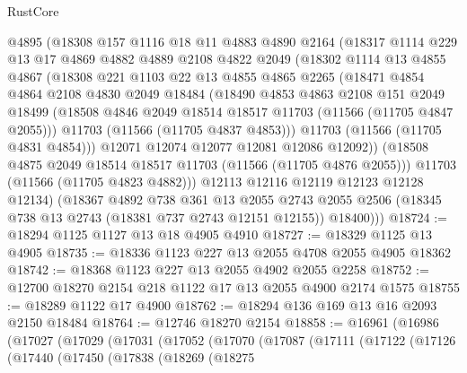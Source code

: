 \begin{lexlean}{RustCore}
\begin{coremodule}
        @4895
        (@18308
          @157
          @1116
          @18
          @11
          @4883
          @4890
          @2164
          (@18317
            @1114
            @229
            @13
            @17
            @4869
            @4882
            @4889
            @2108
            @4822
            @2049
            (@18302
              @1114
              @13
              @4855
              @4867
              (@18308
                @221
                @1103
                @22
                @13
                @4855
                @4865
                @2265
                (@18471
                  @4854
                  @4864
                  @2108
                  @4830
                  @2049
                  @18484
                  (@18490
                    @4853
                    @4863
                    @2108
                    @151
                    @2049
                    @18499
                    (@18508 @4846 @2049 @18514 @18517 @11703 (@11566 (@11705 @4847 @2055)))
                    @11703
                    (@11566 (@11705 @4837 @4853)))
                  @11703
                  (@11566 (@11705 @4831 @4854)))
                @12071
                @12074
                @12077
                @12081
                @12086
                @12092))
            (@18508 @4875 @2049 @18514 @18517 @11703 (@11566 (@11705 @4876 @2055)))
            @11703
            (@11566 (@11705 @4823 @4882)))
          @12113
          @12116
          @12119
          @12123
          @12128
          @12134)
        (@18367
          @4892
          @738
          @361
          @13
          @2055
          @2743
          @2055
          @2506
          (@18345 @738 @13 @2743 (@18381 @737 @2743 @12151 @12155))
          @18400)))
@18724 := @18294 @1125 @1127 @13 @18 @4905 @4910
@18727 := @18329 @1125 @13 @4905
@18735 := @18336 @1123 @227 @13 @2055 @4708 @2055 @4905 @18362
@18742 := @18368 @1123 @227 @13 @2055 @4902 @2055 @2258
@18752 := @12700 @18270 @2154 @218 @1122 @17 @13 @2055 @4900 @2174 @1575
@18755 := @18289 @1122 @17 @4900
@18762 := @18294 @136 @169 @13 @16 @2093 @2150 @18484
@18764 := @12746 @18270 @2154
@18858 := @16961
    (@16986
      (@17027
        (@17029
          (@17031
            (@17052
              (@17070
                (@17087
                  (@17111
                    (@17122
                      (@17126
                        (@17440
                          (@17450
                            (@17838
                              (@18269
                                (@18275

\end{coremodule}
\end{lexlean}
